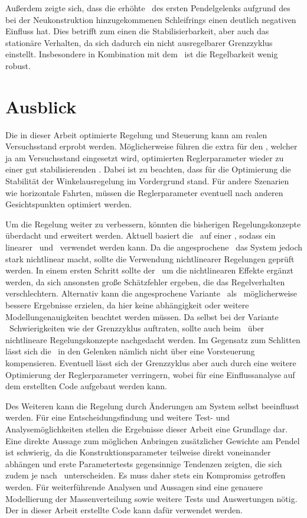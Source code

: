 Außerdem zeigte sich, dass die erhöhte \crb\ des ersten Pendelgelenks aufgrund des bei der Neukonstruktion hinzugekommenen Schleifrings einen deutlich negativen Einfluss hat.
Dies betrifft zum einen die Stabilisierbarkeit, aber auch das stationäre Verhalten, da sich dadurch ein nicht ausregelbarer Grenzzyklus einstellt.
Insbesondere in Kombination mit dem \beob\ ist die Regelbarkeit wenig robust.



\traj

  

\section{Ausblick}

Die in dieser Arbeit optimierte Regelung und Steuerung kann am realen Versuchsstand erprobt werden.
Möglicherweise führen die extra für den \beob, welcher ja am Versuchsstand eingesetzt wird, optimierten Reglerparameter wieder zu einer gut stabilisierenden \aprg.
Dabei ist zu beachten, dass für die Optimierung die Stabilität der Winkelausregelung im Vordergrund stand.
Für andere Szenarien wie horizontale Fahrten, müssen die Reglerparameter eventuell nach anderen Gesichtspunkten optimiert werden.

Um die Regelung weiter zu verbessern, könnten die bisherigen Regelungskonzepte überdacht und erweitert werden.
Aktuell basiert die \aprg\ auf einer \lin, sodass ein linearer \zsr\ und \beob\ verwendet werden kann.
Da die angesprochene \crb\ das System jedoch stark nichtlinear macht, sollte die Verwendung nichtlinearer Regelungen geprüft werden.
In einem ersten Schritt sollte der \beob\ um die nichtlinearen Effekte ergänzt werden, da sich ansonsten große Schätzfehler ergeben, die das Regelverhalten verschlechtern.
Alternativ kann die angesprochene Variante \diff\ als \ze\ möglicherweise bessere Ergebnisse erzielen, da hier keine \ap abhängigkeit oder weitere Modellungenauigkeiten beachtet werden müssen.
Da selbst bei der Variante \zm\ Schwierigkeiten wie der Grenzzyklus auftraten, sollte auch beim \zsr\ über nichtlineare Regelungskonzepte nachgedacht werden.
Im Gegensatz zum Schlitten lässt sich die \crb\ in den Gelenken nämlich nicht über eine Vorsteuerung kompensieren.
Eventuell lässt sich der Grenzzyklus aber auch durch eine weitere Optimierung der Reglerparameter verringern, wobei für eine Einflussanalyse auf dem erstellten Code aufgebaut werden kann.

Des Weiteren kann die Regelung durch Änderungen am System selbst beeinflusst werden.
Für eine Entscheidungsfindung und weitere Test- und Analysemöglichkeiten stellen die Ergebnisse dieser Arbeit eine Grundlage dar.
Eine direkte Aussage zum möglichen Anbringen zusätzlicher Gewichte am Pendel ist schwierig, da die Konstruktionsparameter teilweise direkt voneinander abhängen und erste Parametertests gegensinnige Tendenzen zeigten, die sich zudem je nach \ap\ unterscheiden.
Es muss daher stets ein Kompromiss getroffen werden.
Für weiterführende Analysen und Aussagen sind eine genauere Modellierung der Massenverteilung sowie weitere Tests und Auswertungen nötig.
Der in dieser Arbeit erstellte Code kann dafür verwendet werden.

